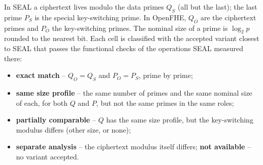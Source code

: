 \documentclass[11pt]{article}
\begin{document}
In SEAL a ciphertext lives modulo the data primes $Q_S$ (all but the last); the last prime $P_S$ is the special key-switching prime. In OpenFHE, $Q_O$ are the ciphertext primes and $P_O$ the key-switching primes. The nominal size of a prime is $\log_2 p$ rounded to the nearest bit. Each cell is classified with the accepted variant closest to SEAL that passes the functional checks of the operations SEAL measured there:
\begin{itemize}[leftmargin=*, itemsep=1pt]
  \item \textbf{exact match} -- $Q_O = Q_S$ and $P_O = P_S$, prime by prime;
  \item \textbf{same size profile} -- the same number of primes and the same nominal size of each, for both $Q$ and $P$, but not the same primes in the same roles;
  \item \textbf{partially comparable} -- $Q$ has the same size profile, but the key-switching modulus differs (other size, or none);
  \item \textbf{separate analysis} -- the ciphertext modulus itself differs; \textbf{not available} -- no variant accepted.
\end{itemize}

{\footnotesize\setlength{\tabcolsep}{3pt}
}
\vspace{-6pt}
\end{document}
